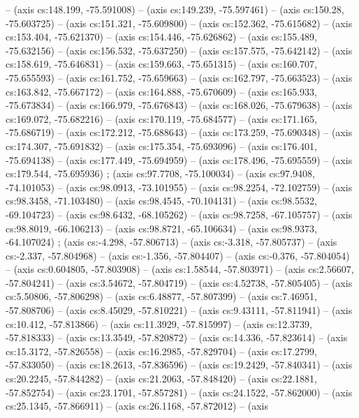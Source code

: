   -- (axis cs:148.199, -75.591008) -- (axis cs:149.239, -75.597461) -- (axis
  cs:150.28, -75.603725) -- (axis cs:151.321, -75.609800) -- (axis cs:152.362,
  -75.615682) -- (axis cs:153.404, -75.621370) -- (axis cs:154.446,
  -75.626862) -- (axis cs:155.489, -75.632156) -- (axis cs:156.532,
  -75.637250) -- (axis cs:157.575, -75.642142) -- (axis cs:158.619,
  -75.646831) -- (axis cs:159.663, -75.651315) -- (axis cs:160.707,
  -75.655593) -- (axis cs:161.752, -75.659663) -- (axis cs:162.797,
  -75.663523) -- (axis cs:163.842, -75.667172) -- (axis cs:164.888,
  -75.670609) -- (axis cs:165.933, -75.673834) -- (axis cs:166.979,
  -75.676843) -- (axis cs:168.026, -75.679638) -- (axis cs:169.072,
  -75.682216) -- (axis cs:170.119, -75.684577) -- (axis cs:171.165,
  -75.686719) -- (axis cs:172.212, -75.688643) -- (axis cs:173.259,
  -75.690348) -- (axis cs:174.307, -75.691832) -- (axis cs:175.354,
  -75.693096) -- (axis cs:176.401, -75.694138) -- (axis cs:177.449,
  -75.694959) -- (axis cs:178.496, -75.695559) -- (axis cs:179.544,
  -75.695936) ;  (axis cs:97.7708, -75.100034) --
  (axis cs:97.9408, -74.101053) -- (axis cs:98.0913, -73.101955) -- (axis
  cs:98.2254, -72.102759) -- (axis cs:98.3458, -71.103480) -- (axis
  cs:98.4545, -70.104131) -- (axis cs:98.5532, -69.104723) -- (axis
  cs:98.6432, -68.105262) -- (axis cs:98.7258, -67.105757) -- (axis
  cs:98.8019, -66.106213) -- (axis cs:98.8721, -65.106634) -- (axis
  cs:98.9373, -64.107024) ;  (axis cs:-4.298,
  -57.806713) -- (axis cs:-3.318, -57.805737) -- (axis cs:-2.337, -57.804968)
  -- (axis cs:-1.356, -57.804407) -- (axis cs:-0.376, -57.804054) -- (axis
  cs:0.604805, -57.803908) -- (axis cs:1.58544, -57.803971) -- (axis
  cs:2.56607, -57.804241) -- (axis cs:3.54672, -57.804719) -- (axis
  cs:4.52738, -57.805405) -- (axis cs:5.50806, -57.806298) -- (axis
  cs:6.48877, -57.807399) -- (axis cs:7.46951, -57.808706) -- (axis
  cs:8.45029, -57.810221) -- (axis cs:9.43111, -57.811941) -- (axis cs:10.412,
  -57.813866) -- (axis cs:11.3929, -57.815997) -- (axis cs:12.3739,
  -57.818333) -- (axis cs:13.3549, -57.820872) -- (axis cs:14.336, -57.823614)
  -- (axis cs:15.3172, -57.826558) -- (axis cs:16.2985, -57.829704) -- (axis
  cs:17.2799, -57.833050) -- (axis cs:18.2613, -57.836596) -- (axis
  cs:19.2429, -57.840341) -- (axis cs:20.2245, -57.844282) -- (axis
  cs:21.2063, -57.848420) -- (axis cs:22.1881, -57.852754) -- (axis
  cs:23.1701, -57.857281) -- (axis cs:24.1522, -57.862000) -- (axis
  cs:25.1345, -57.866911) -- (axis cs:26.1168, -57.872012) -- (axis
